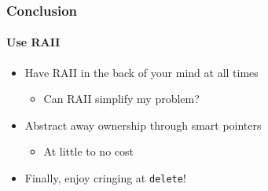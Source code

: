 \begin{frame}
    \frametitle{Conclusion}
    \framesubtitle{Use RAII}
    \begin{itemize}
        \item<1->Have RAII in the back of your mind at all times
            \begin{itemize}
                \item Can RAII simplify my problem?
            \end{itemize}
        \item<1->Abstract away ownership through smart pointers
            \begin{itemize}
                \item At little to no cost
            \end{itemize}
        \item<2->Finally, enjoy cringing at \texttt{delete}!
    \end{itemize}
\end{frame}




